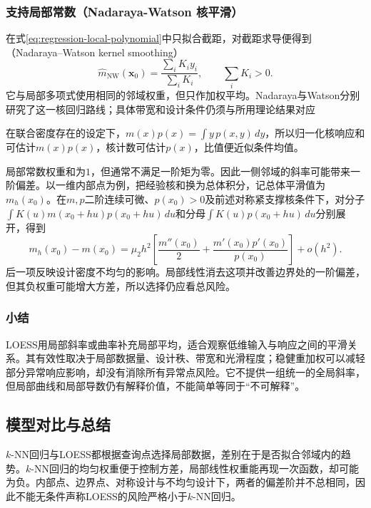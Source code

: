 \subsubsection{支持局部常数（Nadaraya-Watson 核平滑）}
\label{sec:regression-nadaraya-watson}

在式\eqref{eq:regression-local-polynomial}中只拟合截距，对截距求导便得到（Nadaraya--Watson kernel smoothing）
\begin{equation}
  \widehat m_{\mathrm{NW}}(\bm{x}_0)
  =\frac{\sum_iK_i y_i}{\sum_iK_i},
  \qquad \sum_iK_i>0.
  \label{eq:regression-nw}
\end{equation}
它与局部多项式使用相同的邻域权重，但只作加权平均。Nadaraya与Watson分别研究了这一核回归路线；具体带宽和设计条件仍须与所用理论结果对应

在联合密度存在的设定下，$m(x)p(x)=\int y\,p(x,y)\,dy$，所以归一化核响应和可估计$m(x)p(x)$，核计数可估计$p(x)$，比值便近似条件均值。

局部常数权重和为$1$，但通常不满足一阶矩为零。因此一侧邻域的斜率可能带来一阶偏差。以一维内部点为例，把经验核和换为总体积分，记总体平滑值为$m_h(x_0)$。在$m,p$二阶连续可微、$p(x_0)>0$及前述对称紧支撑核条件下，对分子$\int K(u)m(x_0+hu)p(x_0+hu)\,du$和分母$\int K(u)p(x_0+hu)\,du$分别展开，得到
\[
  m_h(x_0)-m(x_0)
  =\mu_2h^2\left[\frac{m''(x_0)}{2}
       +\frac{m'(x_0)p'(x_0)}{p(x_0)}\right]+o(h^2).
\]
后一项反映设计密度不均匀的影响。局部线性消去这项并改善边界处的一阶偏差，但其负权重可能增大方差，所以选择仍应看总风险。

\subsubsection{小结}

LOESS用局部斜率或曲率补充局部平均，适合观察低维输入与响应之间的平滑关系。其有效性取决于局部数据量、设计秩、带宽和光滑程度；稳健重加权可以减轻部分异常响应影响，却没有消除所有异常点风险。它不提供一组统一的全局斜率，但局部曲线和局部导数仍有解释价值，不能简单等同于“不可解释”。

\subsection{模型对比与总结}

$k$-NN回归与LOESS都根据查询点选择局部数据，差别在于是否拟合邻域内的趋势。$k$-NN回归的均匀权重便于控制方差，局部线性权重能再现一次函数，却可能为负。内部点、边界点、对称设计与不均匀设计下，两者的偏差阶并不总相同，因此不能无条件声称LOESS的风险严格小于$k$-NN回归。

